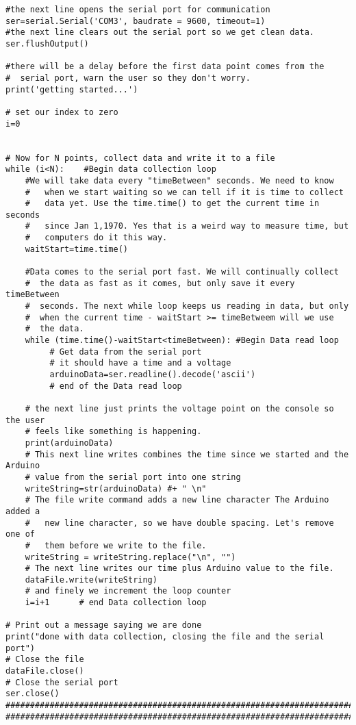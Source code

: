 \begin{verbatim}
#the next line opens the serial port for communication
ser=serial.Serial('COM3', baudrate = 9600, timeout=1)
#the next line clears out the serial port so we get clean data.
ser.flushOutput()
 
#there will be a delay before the first data point comes from the 
#  serial port, warn the user so they don't worry.
print('getting started...')
 
# set our index to zero
i=0
 
 
# Now for N points, collect data and write it to a file
while (i<N):    #Begin data collection loop
    #We will take data every "timeBetween" seconds. We need to know 
    #   when we start waiting so we can tell if it is time to collect 
    #   data yet. Use the time.time() to get the current time in seconds
    #   since Jan 1,1970. Yes that is a weird way to measure time, but 
    #   computers do it this way.
    waitStart=time.time()
    
    #Data comes to the serial port fast. We will continually collect 
    #  the data as fast as it comes, but only save it every timeBetween
    #  seconds. The next while loop keeps us reading in data, but only 
    #  when the current time - waitStart >= timeBetweem will we use 
    #  the data.
    while (time.time()-waitStart<timeBetween): #Begin Data read loop
         # Get data from the serial port
         # it should have a time and a voltage
         arduinoData=ser.readline().decode('ascii')
         # end of the Data read loop
         
    # the next line just prints the voltage point on the console so the user 
    # feels like something is happening.
    print(arduinoData)
    # This next line writes combines the time since we started and the Arduino 
    # value from the serial port into one string
    writeString=str(arduinoData) #+ " \n"
    # The file write command adds a new line character The Arduino added a 
    #   new line character, so we have double spacing. Let's remove one of 
    #   them before we write to the file.
    writeString = writeString.replace("\n", "")
    # The next line writes our time plus Arduino value to the file.
    dataFile.write(writeString)
    # and finely we increment the loop counter
    i=i+1      # end Data collection loop   
    
# Print out a message saying we are done
print("done with data collection, closing the file and the serial port")
# Close the file
dataFile.close()
# Close the serial port   
ser.close() 
###############################################################################
###############################################################################
 
\end{verbatim}

